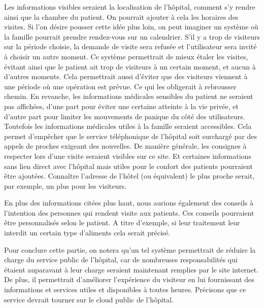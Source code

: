 Les informations visibles seraient la localisation de l'hôpital, comment s'y rendre ainsi que la chambre du patient. On pourrait
ajouter à cela les horaires des visites. Si l'on désire pousser cette idée plus loin, on peut imaginer un système où la famille
pourrait prendre rendez-vous sur un calendrier. S'il y a trop de visiteurs sur la période choisie, la demande de visite sera
refusée et l'utilisateur sera invité à choisir un autre moment. Ce système permettrait de mieux étaler les visites, évitant ainsi
que le patient ait trop de visiteurs à un certain moment, et aucun à d'autres moments. Cela permettrait aussi d'éviter que des
visiteurs viennent à une période où une opération est prévue. Ce qui les obligerait à rebrousser chemin. En revanche, les
informations médicales sensibles du patient ne seraient pas affichées, d'une part pour éviter une certaine atteinte à la vie
privée, et d'autre part pour limiter les mouvements de panique du côté des utilisateurs. Toutefois les informations médicales
utiles à la famille seraient accessibles. Cela permet d'empêcher que le service téléphonique de l'hôpital soit  surchargé par des
appels de proches exigeant des nouvelles. De manière générale, les consignes à respecter lors d'une visite seraient visibles sur
ce site. Et certaines informations sans lien direct avec l'hôpital mais utiles pour le confort des patients pourraient être
ajoutées. Connaître l'adresse de l'hôtel (ou équivalent) le plus proche serait, par exemple, un plus pour les visiteurs.
\newline

En plus des informations citées plus haut, nous aurions également des conseils à l'intention des personnes qui rendent visite aux
patients. Ces conseils pourraient être personnalisés selon le patient. A titre d'exemple, si leur traitement leur interdit un certain type d'aliments
cela serait précisé. 
\newline

Pour conclure cette partie, on notera qu'un tel système permettrait de réduire la charge du service public de l'hôpital, car de
nombreuses responsabilités qui étaient auparavant à leur charge seraient maintenant remplies par le site internet. De plus, il permettrait
d'améliorer l'expérience du visiteur en lui fournissant des informations et services utiles et disponibles à toutes heures.
Précisons que ce service devrait tourner sur le cloud public de l'hôpital.
\newline

